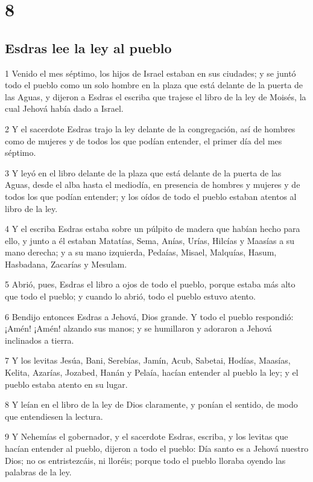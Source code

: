\chapter{8}

\section*{Esdras lee la ley al pueblo}

\par 1 Venido el mes séptimo, los hijos de Israel estaban en sus ciudades; y se juntó todo el pueblo como un solo hombre en la plaza que está delante de la puerta de las Aguas, y dijeron a Esdras el escriba que trajese el libro de la ley de Moisés, la cual Jehová había dado a Israel.
\par 2 Y el sacerdote Esdras trajo la ley delante de la congregación, así de hombres como de mujeres y de todos los que podían entender, el primer día del mes séptimo.
\par 3 Y leyó en el libro delante de la plaza que está delante de la puerta de las Aguas, desde el alba hasta el mediodía, en presencia de hombres y mujeres y de todos los que podían entender; y los oídos de todo el pueblo estaban atentos al libro de la ley.
\par 4 Y el escriba Esdras estaba sobre un púlpito de madera que habían hecho para ello, y junto a él estaban Matatías, Sema, Anías, Urías, Hilcías y Maasías a su mano derecha; y a su mano izquierda, Pedaías, Misael, Malquías, Hasum, Hasbadana, Zacarías y Mesulam.
\par 5 Abrió, pues, Esdras el libro a ojos de todo el pueblo, porque estaba más alto que todo el pueblo; y cuando lo abrió, todo el pueblo estuvo atento.
\par 6 Bendijo entonces Esdras a Jehová, Dios grande. Y todo el pueblo respondió: ¡Amén! ¡Amén! alzando sus manos; y se humillaron y adoraron a Jehová inclinados a tierra.
\par 7 Y los levitas Jesúa, Bani, Serebías, Jamín, Acub, Sabetai, Hodías, Maasías, Kelita, Azarías, Jozabed, Hanán y Pelaía, hacían entender al pueblo la ley; y el pueblo estaba atento en su lugar.
\par 8 Y leían en el libro de la ley de Dios claramente, y ponían el sentido, de modo que entendiesen la lectura.
\par 9 Y Nehemías el gobernador, y el sacerdote Esdras, escriba, y los levitas que hacían entender al pueblo, dijeron a todo el pueblo: Día santo es a Jehová nuestro Dios; no os entristezcáis, ni lloréis; porque todo el pueblo lloraba oyendo las palabras de la ley.
